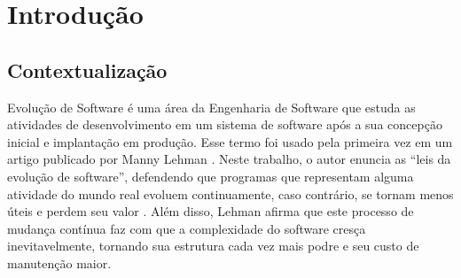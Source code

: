\documentclass[a4paper, 12pt, twoside]{book}
\begin{document}
\begin{titlepage}
\vspace*{\fill}
\vspace{-5cm}
\vspace{2cm}
\vspace{1cm}
\vfill
\end{titlepage}


\pagestyle{plain}
\setcounter{page}{1} 
\tableofcontents

\newpage

\setcounter{page}{1}

\chapter{Introdução}

    \section{Contextualização}
        Evolução de Software é uma área da Engenharia de Software que estuda as atividades de desenvolvimento
        em um sistema de software após a sua concepção inicial e implantação em produção. Esse termo foi 
        usado pela primeira vez em um artigo publicado por Manny Lehman \cite{DBLP:series/springer/Mens08}. 
        Neste trabalho, o autor enuncia as ``leis da evolução de software'', defendendo que programas que 
        representam alguma atividade do mundo real evoluem continuamente, caso contrário, se tornam
        menos úteis e perdem seu valor \cite{Lehman1980b}. Além disso, Lehman afirma que este processo 
        de mudança contínua faz com que a complexidade do software cresça inevitavelmente, tornando sua 
        estrutura cada vez mais podre e seu custo de manutenção maior.
        
\end{document}
